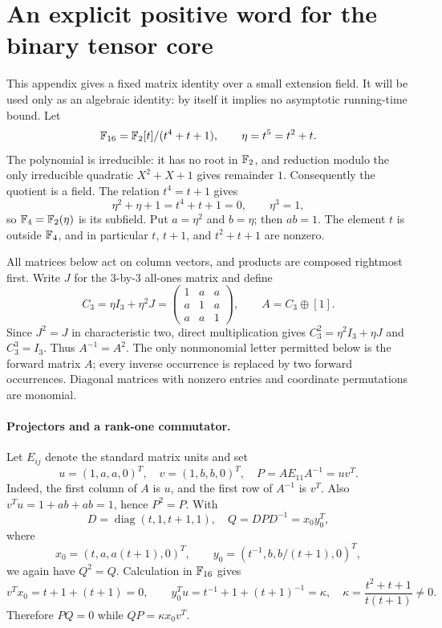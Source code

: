 \section{An explicit positive word for the binary tensor core}\label{app:word}

This appendix gives a fixed matrix identity over a small extension field. It
will be used only as an algebraic identity: by itself it implies no
asymptotic running-time bound. Let
\[
   \mathbb F_{16}=\mathbb F_2[t]/(t^4+t+1),\qquad \eta=t^5=t^2+t.
\]
The polynomial is irreducible: it has no root in $\mathbb F_2$, and reduction
modulo the only irreducible quadratic $X^2+X+1$ gives remainder $1$.
Consequently the quotient is a field. The relation $t^4=t+1$ gives
\[
  \eta^2+\eta+1=t^4+t+1=0,\qquad \eta^3=1,
\]
so $\mathbb F_4=\mathbb F_2(\eta)$ is its subfield. Put $a=\eta^2$ and $b=\eta$;
then $ab=1$. The element $t$ is outside $\mathbb F_4$, and in particular
$t$, $t+1$, and $t^2+t+1$ are nonzero.

All matrices below act on column vectors, and products are composed
rightmost first. Write $J$ for the $3$-by-$3$ all-ones matrix and define
\[
 C_3=\eta I_3+\eta^2J
   =\begin{pmatrix}1&a&a\\a&1&a\\a&a&1\end{pmatrix},
 \qquad A=C_3\oplus[1].
\]
Since $J^2=J$ in characteristic two, direct multiplication gives
$C_3^2=\eta^2I_3+\eta J$ and $C_3^3=I_3$. Thus $A^{-1}=A^2$.
The only nonmonomial letter permitted below is the forward matrix $A$;
every inverse occurrence is replaced by two forward occurrences. Diagonal
matrices with nonzero entries and coordinate permutations are monomial.

\paragraph{Projectors and a rank-one commutator.}
Let $E_{ij}$ denote the standard matrix units and set
\[
 u=(1,a,a,0)^T,\quad v=(1,b,b,0)^T,\quad
 P=A E_{11}A^{-1}=uv^T.
\]
Indeed, the first column of $A$ is $u$, and the first row of $A^{-1}$
is $v^T$. Also $v^Tu=1+ab+ab=1$, hence $P^2=P$. With
\[
 D=\operatorname{diag}(t,1,t+1,1),\quad Q=DPD^{-1}=x_0y_0^T,
\]
where
\[
 x_0=(t,a,a(t+1),0)^T,\qquad
 y_0=(t^{-1},b,b/(t+1),0)^T,
\]
we again have $Q^2=Q$. Calculation in $\mathbb F_{16}$ gives
\[
 v^Tx_0=t+1+(t+1)=0,\qquad
 y_0^Tu=t^{-1}+1+(t+1)^{-1}=\kappa,
 \quad \kappa=\frac{t^2+t+1}{t(t+1)}\ne0.
\]
Therefore $PQ=0$ while $QP=\kappa x_0v^T$.

